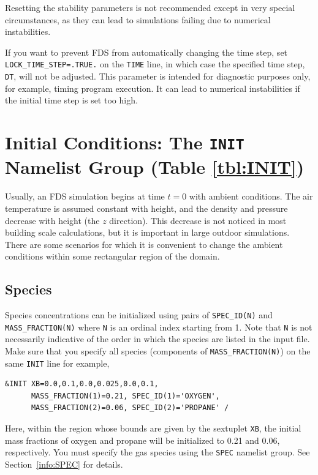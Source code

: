 \documentclass[11pt]{book}
\newcommand{\ct}{\tt\small}
\begin{document}
\begin{warning}
Resetting the stability parameters is not recommended except in very special circumstances, as they can lead to
simulations failing due to numerical instabilities.
\end{warning}

\noindent
If you want to prevent FDS from automatically changing the time step, set {\ct LOCK\_TIME\_STEP=.TRUE.}
on the {\ct TIME} line, in which case the specified
time step, {\ct DT}, will not be adjusted.
This parameter is intended for diagnostic purposes only, for example, timing program execution. It can lead to
numerical instabilities if the initial time step is set too high.


\clearpage


\section{Initial Conditions: The \texorpdfstring{{\tt INIT}}{INIT} Namelist Group (Table \ref{tbl:INIT})}
\label{info:INIT}

Usually, an FDS simulation begins at time $t=0$ with ambient conditions. The air temperature is
assumed constant with height, and the density and pressure decrease with height (the $z$ direction). This
decrease is not noticed in most building scale calculations, but it is important in large outdoor
simulations. There are some scenarios for which it is convenient to change the ambient conditions within some
rectangular region of the domain.

\subsection*{Species}

Species concentrations can be initialized using pairs of {\ct SPEC\_ID(N)} and {\ct MASS\_FRACTION(N)} where {\ct N} is an ordinal index starting from 1. Note that {\ct N} is not necessarily indicative of the order in which the species are listed in the input file.
Make sure that you specify all species (components of {\ct MASS\_FRACTION(N)}) on the same {\ct INIT} line for example,

\footnotesize
\begin{verbatim}
&INIT XB=0.0,0.1,0.0,0.025,0.0,0.1,
      MASS_FRACTION(1)=0.21, SPEC_ID(1)='OXYGEN',
      MASS_FRACTION(2)=0.06, SPEC_ID(2)='PROPANE' /
\end{verbatim}
\normalsize

\noindent Here, within the region whose bounds are given by the sextuplet {\ct XB}, the initial mass fractions of oxygen and propane will be initialized to 0.21 and 0.06, respectively. You must specify the gas species using the {\ct SPEC} namelist group. See Section~\ref{info:SPEC} for details.
\end{document}
